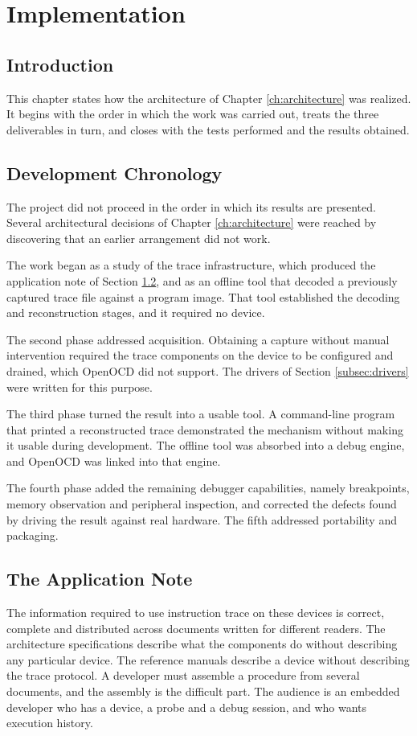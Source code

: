 \chapter{Implementation}

\section*{Introduction}
This chapter states how the architecture of Chapter \ref{ch:architecture} was realized. It begins with the order in which the work was carried out, treats the three deliverables in turn, and closes with the tests performed and the results obtained.

\section{Development Chronology}
The project did not proceed in the order in which its results are presented. Several architectural decisions of Chapter \ref{ch:architecture} were reached by discovering that an earlier arrangement did not work.

The work began as a study of the trace infrastructure, which produced the application note of Section \ref{sec:appnote}, and as an offline tool that decoded a previously captured trace file against a program image. That tool established the decoding and reconstruction stages, and it required no device.

The second phase addressed acquisition. Obtaining a capture without manual intervention required the trace components on the device to be configured and drained, which OpenOCD did not support. The drivers of Section \ref{subsec:drivers} were written for this purpose.

The third phase turned the result into a usable tool. A command-line program that printed a reconstructed trace demonstrated the mechanism without making it usable during development. The offline tool was absorbed into a debug engine, and OpenOCD was linked into that engine.

The fourth phase added the remaining debugger capabilities, namely breakpoints, memory observation and peripheral inspection, and corrected the defects found by driving the result against real hardware. The fifth addressed portability and packaging.


\section{The Application Note}
\label{sec:appnote}
The information required to use instruction trace on these devices is correct, complete and distributed across documents written for different readers. The architecture specifications describe what the components do without describing any particular device. The reference manuals describe a device without describing the trace protocol. A developer must assemble a procedure from several documents, and the assembly is the difficult part. The audience is an embedded developer who has a device, a probe and a debug session, and who wants execution history.

